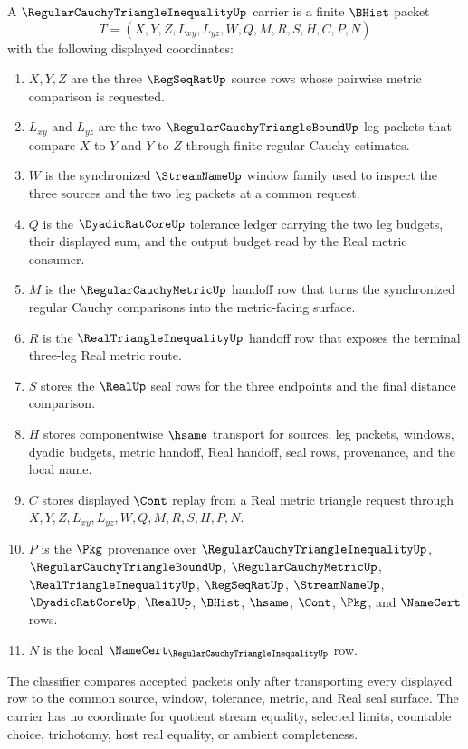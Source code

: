 \begin{definition}
\label{def:regular-cauchy-triangle-inequality-carrier}
A $\RegularCauchyTriangleInequalityUp$ carrier is a finite $\BHist$ packet
$$
T=(X,Y,Z,L_{xy},L_{yz},W,Q,M,R,S,H,C,P,N)
$$
with the following displayed coordinates:
\begin{enumerate}
\item $X,Y,Z$ are the three $\RegSeqRatUp$ source rows whose pairwise metric comparison is requested.
\item $L_{xy}$ and $L_{yz}$ are the two $\RegularCauchyTriangleBoundUp$ leg packets that compare $X$ to $Y$ and $Y$ to $Z$ through finite regular Cauchy estimates.
\item $W$ is the synchronized $\StreamNameUp$ window family used to inspect the three sources and the two leg packets at a common request.
\item $Q$ is the $\DyadicRatCoreUp$ tolerance ledger carrying the two leg budgets, their displayed sum, and the output budget read by the Real metric consumer.
\item $M$ is the $\RegularCauchyMetricUp$ handoff row that turns the synchronized regular Cauchy comparisons into the metric-facing surface.
\item $R$ is the $\RealTriangleInequalityUp$ handoff row that exposes the terminal three-leg Real metric route.
\item $S$ stores the $\RealUp$ seal rows for the three endpoints and the final distance comparison.
\item $H$ stores componentwise $\hsame$ transport for sources, leg packets, windows, dyadic budgets, metric handoff, Real handoff, seal rows, provenance, and the local name.
\item $C$ stores displayed $\Cont$ replay from a Real metric triangle request through $X,Y,Z,L_{xy},L_{yz},W,Q,M,R,S,H,P,N$.
\item $P$ is the $\Pkg$ provenance over $\RegularCauchyTriangleInequalityUp$, $\RegularCauchyTriangleBoundUp$, $\RegularCauchyMetricUp$, $\RealTriangleInequalityUp$, $\RegSeqRatUp$, $\StreamNameUp$, $\DyadicRatCoreUp$, $\RealUp$, $\BHist$, $\hsame$, $\Cont$, $\Pkg$, and $\NameCert$ rows.
\item $N$ is the local $\NameCert_{\RegularCauchyTriangleInequalityUp}$ row.
\end{enumerate}
The classifier compares accepted packets only after transporting every displayed row to the common source, window, tolerance, metric, and Real seal surface. The carrier has no coordinate for quotient stream equality, selected limits, countable choice, trichotomy, host real equality, or ambient completeness.
\end{definition}

